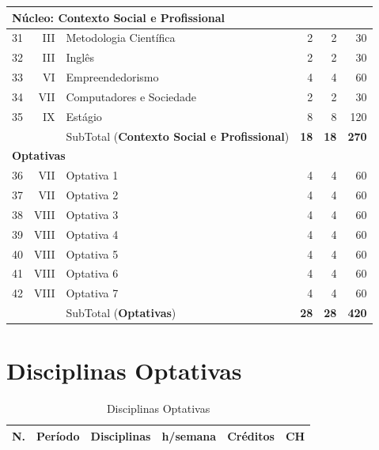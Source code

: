 \documentclass[
	12pt,				%
	openright,			%
  oneside,     %
	a4paper,			%
	english,			%
	french,				%
	spanish,			%
	brazil				%
	]{abntex2}
\begin{document}
\begin{apendicesenv}
\begin{longtable}{r|r|l|r|r|r}
\multicolumn{6}{l}{Núcleo: \textbf{Contexto Social e Profissional}}\\     \hline
    31    & III   & Metodologia Científica & 2     & 2     & 30 \\     \hline
    32    & III   & Inglês & 2     & 2     & 30 \\    \hline
    33    & VI    & Empreendedorismo & 4     & 4     & 60 \\    \hline
    34    & VII  & Computadores e Sociedade & 2     & 2     & 30 \\ \hline
    35    & IX  & Estágio & 8     & 8     & 120 \\           \hline
          &       & SubTotal (\textbf{Contexto Social e Profissional}) & \textbf{18}    & \textbf{18}    & \textbf{270} \\    \hline
\multicolumn{6}{l}{\textbf{Optativas}} \\ \hline
    36    & VII   & Optativa 1 & 4     & 4     & 60 \\ \hline
    37    & VII   & Optativa 2 & 4     & 4     & 60 \\ \hline
    38    & VIII  & Optativa 3 & 4     & 4     & 60 \\ \hline
    39    & VIII  & Optativa 4 & 4     & 4     & 60 \\ \hline
    40    & VIII  & Optativa 5 & 4     & 4     & 60 \\ \hline
    41    & VIII  & Optativa 6 & 4     & 4     & 60 \\ \hline
    42    & VIII  & Optativa 7 & 4     & 4     & 60 \\ \hline
    \textbf{} & \textbf{} & SubTotal (\textbf{Optativas}) & \textbf{28} & \textbf{28} & \textbf{420} \\ \hline
\end{longtable}%


\chapter{Disciplinas Optativas}

\begin{longtable}{r|r|l|r|r|r}
     \caption{Disciplinas Optativas}
     \label{ltab:teste}
     \\
\hline
    N.    & Período & Disciplinas                       & h/semana & Créditos & CH \\ \hline


\end{longtable}
\end{apendicesenv}
\end{document}
